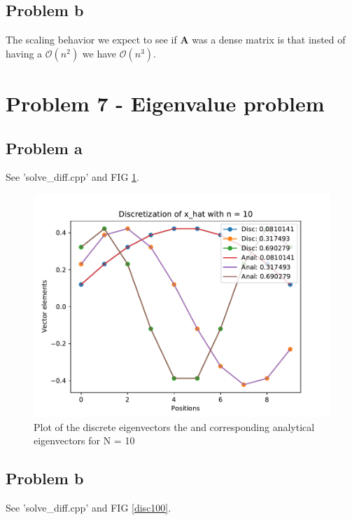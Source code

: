 \documentclass[english,notitlepage]{revtex4-1}  %
\begin{document}
\subsection*{Problem b}
The scaling behavior we expect to see if $\mathbf{A}$ was a dense matrix is that insted of having a $\mathcal{O}(n^2)$ we have $\mathcal{O}(n^3)$.


\section*{Problem 7 - Eigenvalue problem}

\subsection*{Problem a}
See 'solve\_diff.cpp' and FIG \ref{disc10}.

\begin{figure}[H]
	\centering
	\includegraphics[scale=0.55]{plots/discretization_n10.pdf} %
	\caption{Plot of the discrete eigenvectors the and corresponding analytical eigenvectors for N = 10}
	\label{disc10}
\end{figure}

\subsection*{Problem b}
See 'solve\_diff.cpp' and FIG \ref{disc100}.
\end{document}

